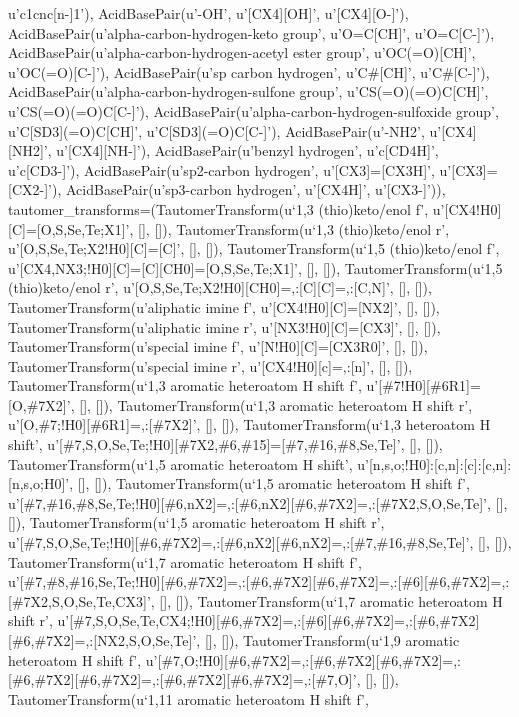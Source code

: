\documentclass[letterpaper,10pt,english]{sphinxmanual}
\begin{document}
\begin{fulllineitems}
u'c1cnc{[}n-{]}1'), AcidBasePair(u'-OH', u'{[}CX4{]}{[}OH{]}', u'{[}CX4{]}{[}O-{]}'), AcidBasePair(u'alpha-carbon-hydrogen-keto group', u'O=C{[}CH{]}', u'O=C{[}C-{]}'), AcidBasePair(u'alpha-carbon-hydrogen-acetyl ester group', u'OC(=O){[}CH{]}', u'OC(=O){[}C-{]}'), AcidBasePair(u'sp carbon hydrogen', u'C\#{[}CH{]}', u'C\#{[}C-{]}'), AcidBasePair(u'alpha-carbon-hydrogen-sulfone group', u'CS(=O)(=O)C{[}CH{]}', u'CS(=O)(=O)C{[}C-{]}'), AcidBasePair(u'alpha-carbon-hydrogen-sulfoxide group', u'C{[}SD3{]}(=O)C{[}CH{]}', u'C{[}SD3{]}(=O)C{[}C-{]}'), AcidBasePair(u'-NH2', u'{[}CX4{]}{[}NH2{]}', u'{[}CX4{]}{[}NH-{]}'), AcidBasePair(u'benzyl hydrogen', u'c{[}CD4H{]}', u'c{[}CD3-{]}'), AcidBasePair(u'sp2-carbon hydrogen', u'{[}CX3{]}={[}CX3H{]}', u'{[}CX3{]}={[}CX2-{]}'), AcidBasePair(u'sp3-carbon hydrogen', u'{[}CX4H{]}', u'{[}CX3-{]}')), tautomer\_transforms=(TautomerTransform(u`1,3 (thio)keto/enol f', u'{[}CX4!H0{]}{[}C{]}={[}O,S,Se,Te;X1{]}', {[}{]}, {[}{]}), TautomerTransform(u`1,3 (thio)keto/enol r', u'{[}O,S,Se,Te;X2!H0{]}{[}C{]}={[}C{]}', {[}{]}, {[}{]}), TautomerTransform(u`1,5 (thio)keto/enol f', u'{[}CX4,NX3;!H0{]}{[}C{]}={[}C{]}{[}CH0{]}={[}O,S,Se,Te;X1{]}', {[}{]}, {[}{]}), TautomerTransform(u`1,5 (thio)keto/enol r', u'{[}O,S,Se,Te;X2!H0{]}{[}CH0{]}=,:{[}C{]}{[}C{]}=,:{[}C,N{]}', {[}{]}, {[}{]}), TautomerTransform(u'aliphatic imine f', u'{[}CX4!H0{]}{[}C{]}={[}NX2{]}', {[}{]}, {[}{]}), TautomerTransform(u'aliphatic imine r', u'{[}NX3!H0{]}{[}C{]}={[}CX3{]}', {[}{]}, {[}{]}), TautomerTransform(u'special imine f', u'{[}N!H0{]}{[}C{]}={[}CX3R0{]}', {[}{]}, {[}{]}), TautomerTransform(u'special imine r', u'{[}CX4!H0{]}{[}c{]}=,:{[}n{]}', {[}{]}, {[}{]}), TautomerTransform(u`1,3 aromatic heteroatom H shift f', u'{[}\#7!H0{]}{[}\#6R1{]}={[}O,\#7X2{]}', {[}{]}, {[}{]}), TautomerTransform(u`1,3 aromatic heteroatom H shift r', u'{[}O,\#7;!H0{]}{[}\#6R1{]}=,:{[}\#7X2{]}', {[}{]}, {[}{]}), TautomerTransform(u`1,3 heteroatom H shift', u'{[}\#7,S,O,Se,Te;!H0{]}{[}\#7X2,\#6,\#15{]}={[}\#7,\#16,\#8,Se,Te{]}', {[}{]}, {[}{]}), TautomerTransform(u`1,5 aromatic heteroatom H shift', u'{[}n,s,o;!H0{]}:{[}c,n{]}:{[}c{]}:{[}c,n{]}:{[}n,s,o;H0{]}', {[}{]}, {[}{]}), TautomerTransform(u`1,5 aromatic heteroatom H shift f', u'{[}\#7,\#16,\#8,Se,Te;!H0{]}{[}\#6,nX2{]}=,:{[}\#6,nX2{]}{[}\#6,\#7X2{]}=,:{[}\#7X2,S,O,Se,Te{]}', {[}{]}, {[}{]}), TautomerTransform(u`1,5 aromatic heteroatom H shift r', u'{[}\#7,S,O,Se,Te;!H0{]}{[}\#6,\#7X2{]}=,:{[}\#6,nX2{]}{[}\#6,nX2{]}=,:{[}\#7,\#16,\#8,Se,Te{]}', {[}{]}, {[}{]}), TautomerTransform(u`1,7 aromatic heteroatom H shift f', u'{[}\#7,\#8,\#16,Se,Te;!H0{]}{[}\#6,\#7X2{]}=,:{[}\#6,\#7X2{]}{[}\#6,\#7X2{]}=,:{[}\#6{]}{[}\#6,\#7X2{]}=,:{[}\#7X2,S,O,Se,Te,CX3{]}', {[}{]}, {[}{]}), TautomerTransform(u`1,7 aromatic heteroatom H shift r', u'{[}\#7,S,O,Se,Te,CX4;!H0{]}{[}\#6,\#7X2{]}=,:{[}\#6{]}{[}\#6,\#7X2{]}=,:{[}\#6,\#7X2{]}{[}\#6,\#7X2{]}=,:{[}NX2,S,O,Se,Te{]}', {[}{]}, {[}{]}), TautomerTransform(u`1,9 aromatic heteroatom H shift f', u'{[}\#7,O;!H0{]}{[}\#6,\#7X2{]}=,:{[}\#6,\#7X2{]}{[}\#6,\#7X2{]}=,:{[}\#6,\#7X2{]}{[}\#6,\#7X2{]}=,:{[}\#6,\#7X2{]}{[}\#6,\#7X2{]}=,:{[}\#7,O{]}', {[}{]}, {[}{]}), TautomerTransform(u`1,11 aromatic heteroatom H shift f', 
\end{fulllineitems}
\end{document}
